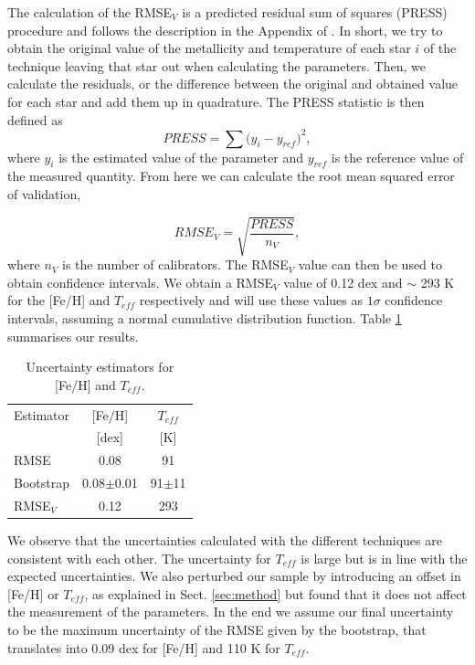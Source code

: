 \documentclass[referee]{aa}
\begin{document}
The calculation of the RMSE$_{V}$ is a predicted residual sum of squares (PRESS) procedure \citep{Weisberg-2005} and follows the description in the Appendix of \citet{Rojas-Ayala-2012}. In short, we try to obtain the original value of the metallicity and temperature of each star $i$ of the technique leaving that star out when calculating the parameters. Then, we calculate the residuals, or the difference between the original and obtained value for each star and add them up in quadrature. The PRESS statistic is then defined as 
\begin{equation}
PRESS = \sum{(y_{i}-y_{ref}})^{2},
\end{equation}
where $y_{i}$ is the estimated value of the parameter and $y_{ref}$ is the reference value of the measured quantity. From here we can calculate the root mean squared error of validation,

\begin{equation}
RMSE_{V} = \sqrt{\frac{PRESS}{n_{V}}},
\end{equation}
where $n_{V}$ is the number of calibrators. The RMSE$_{V}$ value can then be used to obtain confidence intervals. We obtain a RMSE$_{V}$ value of 0.12 dex and $\sim$ 293 K for the [Fe/H] and $T_{eff}$ respectively and will use these values as $1\sigma$ confidence intervals, assuming a normal cumulative distribution function. Table \ref{table:errors} summarises our results. 

\begin{table}[h!]
\centering
\caption[]{Uncertainty estimators for [Fe/H] and $T_{eff}$.}
\label{table:errors}
\begin{tabular}{l c c}
\hline
\hline
Estimator & [Fe/H] & $T_{eff}$ \\ 
                &  [dex]  &  [K] \\
\hline
RMSE & 0.08 & 91\\
Bootstrap & 0.08$\pm$0.01 & 91$\pm$11 \\
RMSE$_{V}$ & 0.12 & 293 \\
\hline
\hline
\end{tabular}
\end{table}

We observe that the uncertainties calculated with the different techniques are consistent with each other. The uncertainty for $T_{eff}$ is large but is in line with the expected uncertainties. We also perturbed our sample by introducing an offset in [Fe/H] or $T_{eff}$, as explained in Sect. \ref{sec:method} but found that it does not affect the measurement of the parameters. In the end we assume our final uncertainty to be the maximum uncertainty of the RMSE given by the bootstrap, that translates into 0.09 dex for [Fe/H] and 110 K for $T_{eff}$.   %
\end{document}
